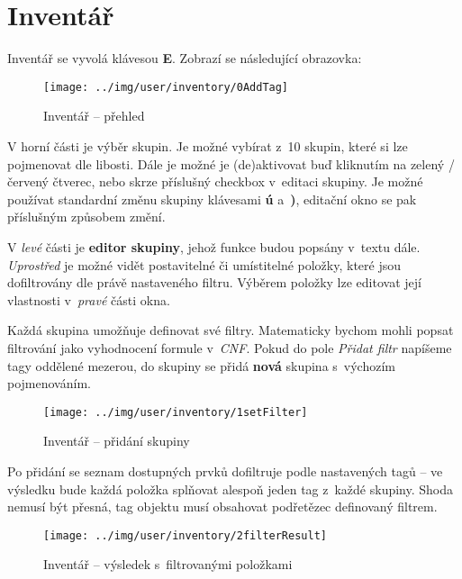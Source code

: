 
\section{Inventář}

Inventář se vyvolá klávesou \textbf{E}. Zobrazí se následující obrazovka:

\begin{figure}[!ht]\centering
\texttt{[image: ../img/user/inventory/0AddTag]}

\caption{Inventář -- přehled}
\label{fig:user_inventory_0AddTag}

\end{figure}

\FloatBarrier

V horní části je výběr skupin. Je možné vybírat z~10 skupin, které si lze pojmenovat dle libosti. Dále je možné je (de)aktivovat buď kliknutím na zelený / červený čtverec, nebo skrze příslušný checkbox v~editaci skupiny.
Je možné používat standardní změnu skupiny klávesami \textbf{ú} a~\textbf{)}, editační okno se pak příslušným způsobem změní. 

V \textit{levé} části je \textbf{editor skupiny}, jehož funkce budou popsány v~textu dále. \textit{Uprostřed} je možné vidět postavitelné či umístitelné položky, které jsou dofiltrovány dle právě nastaveného filtru. Výběrem položky lze editovat její vlastnosti v~\textit{pravé} části okna.

\FloatBarrier

Každá skupina umožňuje definovat své filtry. Matematicky bychom mohli popsat filtrování jako vyhodnocení formule v~\textit{CNF}. Pokud do pole \textit{Přidat filtr} napíšeme tagy oddělené mezerou, do skupiny se přidá \textbf{nová} skupina s~výchozím pojmenováním.

\begin{figure}[!ht]\centering
\texttt{[image: ../img/user/inventory/1setFilter]}

\caption{Inventář -- přidání skupiny}
\label{fig:user_inventory_1setFilter}

\end{figure}

\FloatBarrier

Po přidání se seznam dostupných prvků dofiltruje podle nastavených tagů -- ve výsledku bude každá položka splňovat alespoň jeden tag z~každé skupiny. Shoda nemusí být přesná, tag objektu musí obsahovat podřetězec definovaný filtrem.
\begin{figure}[!ht]\centering
\texttt{[image: ../img/user/inventory/2filterResult]}

\caption{Inventář -- výsledek s~filtrovanými položkami}
\label{fig:user_inventory_2filterResult}

\end{figure}

